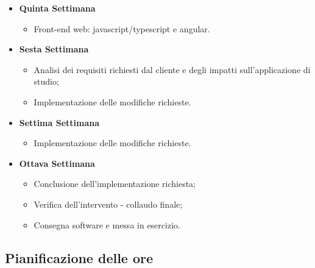 \begin{itemize}
	\item \textbf{Quinta Settimana}
	\begin{itemize}
		\item Front-end web: \gls{javascript}/\gls{typescript} e \gls{angular}.
	\end{itemize}

	\item \textbf{Sesta Settimana}
	\begin{itemize}
		\item Analisi dei requisiti richiesti dal cliente e degli impatti sull'applicazione di studio;
		\item Implementazione delle modifiche richieste.
	\end{itemize}

	\item \textbf{Settima Settimana}
	\begin{itemize}
		\item Implementazione delle modifiche richieste.
	\end{itemize}

	\item \textbf{Ottava Settimana}
	\begin{itemize}
		\item Conclusione dell'implementazione richiesta;
		\item Verifica dell'intervento - collaudo finale;
		\item Consegna software e messa in esercizio.
	\end{itemize}
\end{itemize}


\clearpage

\subsection{Pianificazione delle ore}

